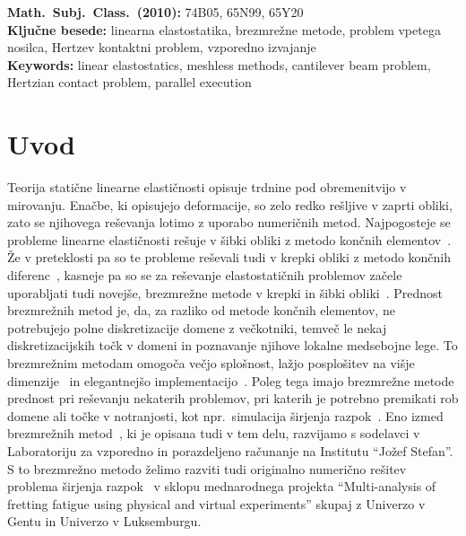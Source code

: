 \documentclass[12pt,a4paper,twoside]{article}
\theoremstyle{definition} %
\theoremstyle{plain} %
\numberwithin{equation}{section}
\let\oldsection\section
\def\section{\cleardoublepage\oldsection}
\begin{document}
\vfill

\noindent
\textbf{Math.~Subj.~Class.~(2010):} 74B05, 65N99, 65Y20 \\[1mm]
\textbf{Ključne besede:} linearna elastostatika, brezmrežne metode, problem vpetega nosilca, Hertzev
kontaktni problem, vzporedno izvajanje \\[1mm]
\textbf{Keywords:} linear elastostatics, meshless methods, cantilever beam problem, Hertzian contact
problem, parallel execution

\cleardoublepage

\setcounter{page}{1}

\section{Uvod}


Teorija statične linearne elastičnosti opisuje trdnine pod obremenitvijo v mirovanju. Enačbe, ki
opisujejo deformacije, so zelo redko rešljive v zaprti obliki, zato se njihovega reševanja lotimo z
uporabo numeričnih metod. Najpogosteje se  probleme linearne elastičnosti rešuje v šibki obliki z
metodo končnih elementov~\cite{uienkiewicz2000finite}. Že v preteklosti pa so te probleme
reševali tudi v krepki obliki z metodo končnih diferenc~\cite{hattel1995control}, kasneje pa
so se za reševanje elastostatičnih problemov začele uporabljati tudi novejše, brezmrežne metode v
krepki in šibki obliki~\cite{chen2006meshless,mavric2015local}. Prednost brezmrežnih metod je, da,
za razliko od metode končnih elementov, ne potrebujejo polne diskretizacije domene z večkotniki,
temveč le nekaj diskretizacijskih točk v domeni in poznavanje njihove lokalne medsebojne lege. To
brezmrežnim metodam omogoča večjo splošnost, lažjo posplošitev na višje
dimenzije~\cite{dehghan2014numerical,li2013localized} in elegantnejšo
implementacijo~\cite{utils_web}. Poleg tega imajo brezmrežne metode prednost pri reševanju nekaterih
problemov, pri katerih je potrebno premikati rob domene ali točke v notranjosti, kot npr.~simulacija
širjenja razpok~\cite{rao2000efficient}. Eno izmed brezmrežnih metod~\cite{kosec2016local}, ki je
opisana tudi v tem delu, razvijamo s sodelavci v Laboratoriju za vzporedno in porazdeljeno računanje
na Institutu ``Jožef Stefan''. S to brezmrežno metodo želimo razviti tudi originalno numerično
rešitev problema širjenja razpok~\cite{pereira2016convergence} v sklopu mednarodnega projekta
``Multi-analysis of fretting fatigue using physical and virtual experiments'' skupaj z Univerzo v
Gentu in Univerzo v Luksemburgu.
\end{document}
